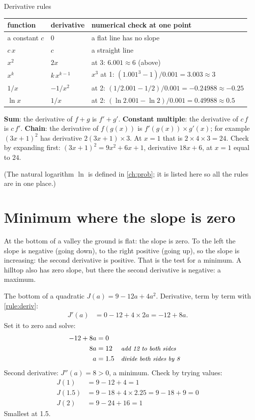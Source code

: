 \documentclass[11pt,a4paper,oneside,openany]{book}
\newcommand{\why}[1]{&&\text{\small\itshape #1}}
\begin{document}
\begin{rulebox}[label=rule:deriv]{Derivative rules}
\begin{center}
\begin{tabular}{@{}ll@{\qquad}l@{}}
\toprule
function & derivative & numerical check at one point\\
\midrule
a constant $c$ & $0$ & a flat line has no slope\\
$c\,x$ & $c$ & a straight line\\
$x^2$ & $2x$ & at 3: $6.001\approx6$ (above)\\
$x^k$ & $k\,x^{k-1}$ & $x^3$ at 1: $(1.001^3-1)/0.001=3.003\approx3$\\
$1/x$ & $-1/x^2$ & at 2: $(1/2.001-1/2)/0.001=-0.24988\approx-0.25$\\
$\ln x$ & $1/x$ & at 2: $(\ln2.001-\ln2)/0.001=0.49988\approx0.5$\\
\bottomrule
\end{tabular}
\end{center}
\textbf{Sum}: the derivative of $f+g$ is $f'+g'$. \textbf{Constant multiple}: the derivative of $c\,f$ is $c\,f'$.
\textbf{Chain}: the derivative of $f(g(x))$ is $f'(g(x))\times g'(x)$; for example $(3x+1)^2$ has derivative
$2(3x+1)\times3$. At $x=1$ that is $2\times4\times3=24$. Check by expanding first: $(3x+1)^2=9x^2+6x+1$, derivative $18x+6$, at
$x=1$ equal to $24$.
\end{rulebox}

(The natural logarithm $\ln$ is defined in \cref{ch:prob}; it is listed here so all the rules are in one place.)

\section{Minimum where the slope is zero}

At the bottom of a valley the ground is flat: the slope is zero. To the left the slope is negative (going down), to the
right positive (going up), so the slope is increasing: the second derivative is positive. That is the test for a minimum.
A hilltop also has zero slope, but there the second derivative is negative: a maximum.

\begin{worked}[label=we:quadmin]{The bottom of a quadratic}
$J(a)=9-12a+4a^2$. Derivative, term by term with \cref{rule:deriv}:
\begin{align*}
J'(a) &= 0-12+4\times2a=-12+8a .
\end{align*}
Set it to zero and solve:
\begin{align*}
-12+8a &= 0\\
8a &= 12 \why{add 12 to both sides}\\
a &= 1.5 \why{divide both sides by 8}
\end{align*}
Second derivative: $J''(a)=8>0$, a minimum. Check by trying values:
\begin{align*}
J(1) &= 9-12+4=1\\
J(1.5) &= 9-18+4\times2.25=9-18+9=0\\
J(2) &= 9-24+16=1
\end{align*}
Smallest at 1.5.
\end{worked}
\end{document}
